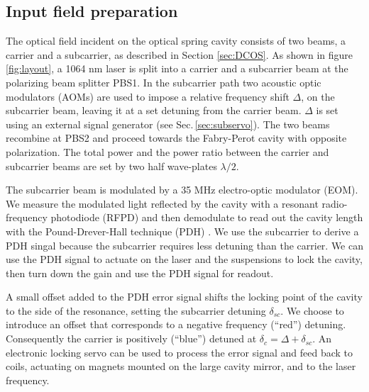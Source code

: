 \subsection{Input field preparation}
\label{sec:layout}

The optical field incident on the optical spring cavity consists of two beams, a carrier and a subcarrier, as described in Section \ref{sec:DCOS}.
As shown in figure \ref{fig:layout}, a 1064 nm laser is split into a carrier and a subcarrier beam at the polarizing beam splitter PBS1. 
In the subcarrier path two acoustic optic modulators (AOMs) are used to impose a relative frequency shift $\Delta$, 
on the subcarrier beam, leaving it at a set detuning from the carrier beam.  
$\Delta$ is set using an external signal generator (see Sec.\,\ref{sec:subservo}).
The two beams recombine at PBS2 and proceed towards the Fabry-Perot cavity with opposite polarization.
The total power and the power ratio between the carrier and subcarrier beams are set by two half wave-plates $\lambda /2$. 

The subcarrier beam is modulated by a 35 MHz electro-optic modulator (EOM). We measure the modulated light reflected by the cavity with a resonant radio-frequency photodiode (RFPD) and then demodulate to read out the cavity length with the Pound-Drever-Hall technique (PDH) \cite{Black01}.  We use the subcarrier to derive a PDH singal because the subcarrier requires less detuning than the carrier. We can use the PDH signal to actuate on the laser and the suspensions to lock the cavity, then turn down the gain and use the PDH signal for readout. 

A small offset added to the PDH error signal shifts the locking point of the cavity to the side of the resonance, setting the subcarrier detuning $\delta_{sc}$. 
We choose to introduce an offset that corresponds to a negative frequency (``red'') detuning. Consequently the carrier is positively (``blue'') detuned at  
$\delta_c = \Delta + \delta_{sc}$. An electronic locking servo can be used to process the error signal and feed back to coils, actuating on
magnets mounted on the large cavity mirror, and to the laser frequency.

